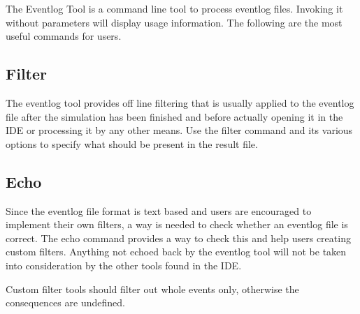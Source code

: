 The Eventlog Tool is a command line tool to process eventlog files. Invoking it without
parameters will display usage information. The following are the most useful commands for users.

\subsection{Filter}
\label{sec:eventlog:filter}

The eventlog tool provides off line filtering that is usually applied to the eventlog file
after the simulation has been finished and before actually opening it in the {\opp} IDE
or processing it by any other means. Use the filter command and its various options to
specify what should be present in the result file.

\subsection{Echo}
\label{sec:eventlog:echo}

Since the eventlog file format is text based and users are encouraged to implement their
own filters, a way is needed to check whether an eventlog file is
correct. The echo command provides a way to check this and help users creating custom
filters. Anything not echoed back by the eventlog tool will not be taken into
consideration by the other tools found in the {\opp} IDE.

\begin{note}
    Custom filter tools should filter out whole events only, otherwise the
    consequences are undefined.
\end{note}

